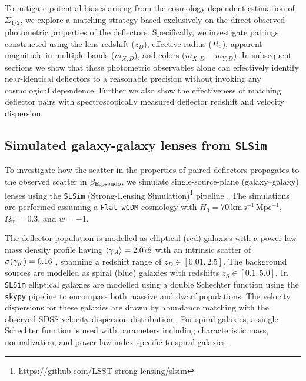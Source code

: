 \documentclass[a4paper,11pt]{article}
\newcommand{\paras}[1]{{\color{red}{PS:- #1}}}
\begin{document}
To mitigate potential biases arising from the cosmology-dependent estimation of $\Sigma_{1/2}$, we explore a matching strategy based exclusively on the direct observed photometric properties of the deflectors. Specifically, we investigate pairings constructed using the lens redshift ($z_D$), effective radius ($R_{\rm e}$), apparent magnitude in multiple bands ($m_{X,D}$), and colors ($m_{X,D} - m_{Y,D}$). In subsequent sections we show that these photometric observables alone can effectively identify near-identical deflectors to a reasonable precision without invoking any cosmological dependence. Further we also show the effectiveness of matching deflector pairs with spectroscopically measured deflector redshift and velocity dispersion. 


\subsection{Simulated galaxy-galaxy lenses from \texttt{SLSim}}\label{sec:slsim_lenses}
To investigate how the scatter in the properties of paired deflectors propagates to the observed scatter in $\beta_{\rm E, pseudo}$, we simulate single-source-plane (galaxy--galaxy) lenses using the \texttt{SLSim} (Strong-Lensing Simulation)\footnote{\href{https://github.com/LSST-strong-lensing/slsim}{https://github.com/LSST-strong-lensing/slsim}} pipeline \cite{Khadka:2026}. The simulations are performed assuming a \texttt{Flat-wCDM} cosmology with $H_0 = 70~\mathrm{km\,s^{-1}\,Mpc^{-1}}$, $\Omega_{\mathrm{m}} = 0.3$, and $w = -1$. 

The deflector population is modelled as elliptical (red) galaxies with a power-law mass density profile having $\langle\gamma_{\rm pl}\rangle = 2.078$ with an intrinsic scatter of $\sigma(\gamma_{\rm pl}) = 0.16$ \cite{Auger:2010}, spanning a redshift range of $z_D \in [0.01, 2.5]$. The background sources are modelled as spiral (blue) galaxies with redshifts $z_S \in [0.1, 5.0]$. In \texttt{SLSim} elliptical galaxies are modelled using a double Schechter function \citep{Schechter:1976} using the \texttt{skypy} \cite{skypy:2021} pipeline to encompass both massive and dwarf populations. The velocity dispersions for these galaxies are drawn by abundance matching with the observed SDSS velocity dispersion distribution \citep{bernadietal2010}. For spiral galaxies, a single Schechter function is used with parameters including characteristic mass, normalization, and power law index specific to spiral galaxies.
\end{document}

